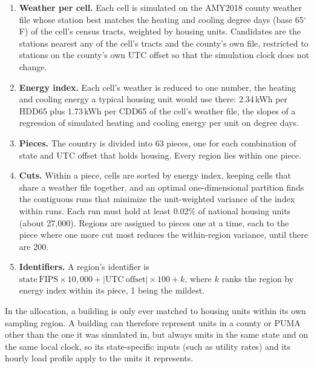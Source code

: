 \begin{enumerate}
    \item \textbf{Weather per cell.} Each cell is simulated on the AMY2018 county weather file whose station best matches the heating and cooling degree days (base 65$^\circ$F) of the cell's census tracts, weighted by housing units. Candidates are the stations nearest any of the cell's tracts and the county's own file, restricted to stations on the county's own UTC offset so that the simulation clock does not change.
    \item \textbf{Energy index.} Each cell's weather is reduced to one number, the heating and cooling energy a typical housing unit would use there: 2.34\,kWh per HDD65 plus 1.73\,kWh per CDD65 of the cell's weather file, the slopes of a regression of simulated heating and cooling energy per unit on degree days.
    \item \textbf{Pieces.} The country is divided into 63 pieces, one for each combination of state and UTC offset that holds housing. Every region lies within one piece.
    \item \textbf{Cuts.} Within a piece, cells are sorted by energy index, keeping cells that share a weather file together, and an optimal one-dimensional partition finds the contiguous runs that minimize the unit-weighted variance of the index within runs. Each run must hold at least 0.02\% of national housing units (about 27,000). Regions are assigned to pieces one at a time, each to the piece where one more cut most reduces the within-region variance, until there are 200.
    \item \textbf{Identifiers.} A region's identifier is $\mathrm{state\ FIPS} \times 10{,}000 + |\mathrm{UTC\ offset}| \times 100 + k$, where $k$ ranks the region by energy index within its piece, 1 being the mildest.
\end{enumerate}

In the allocation, a building is only ever matched to housing units within its own sampling region. A building can therefore represent units in a county or PUMA other than the one it was simulated in, but always units in the same state and on the same local clock, so its state-specific inputs (such as utility rates) and its hourly load profile apply to the units it represents.

